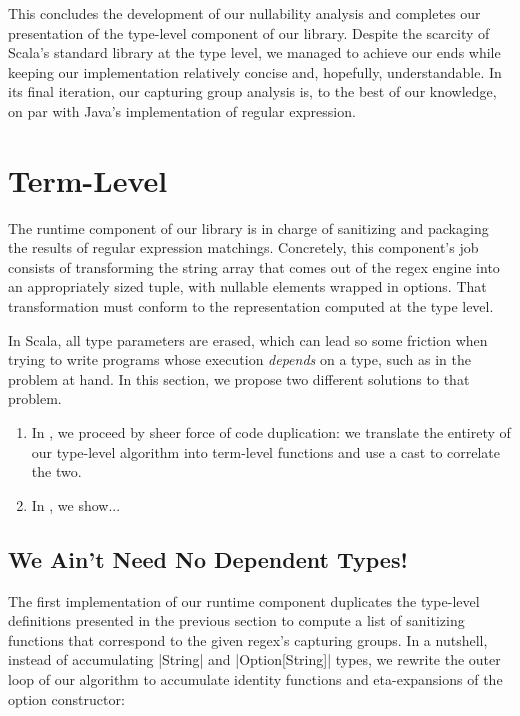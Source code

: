 This concludes the development of our nullability analysis and completes our presentation of the type-level component of our library.
Despite the scarcity of Scala's standard library at the type level, we managed to achieve our ends while keeping our implementation relatively concise and, hopefully, understandable.
In its final iteration, our capturing group analysis is, to the best of our knowledge, on par with Java's implementation of regular expression.

\section{Term-Level}
\label{sec:term-level}

The runtime component of our library is in charge of sanitizing and packaging the results of regular expression matchings.
Concretely, this component's job consists of transforming the string array that comes out of the regex engine into an appropriately sized tuple, with nullable elements wrapped in options.
That transformation must conform to the representation computed at the type level.

In Scala, all type parameters are erased, which can lead so some friction when trying to write programs whose execution \emph{depends} on a type, such as in the problem at hand. In this section, we propose two different solutions to that problem.

\begin{enumerate}
  \item In , we proceed by sheer force of code duplication: we translate the entirety of our type-level algorithm into term-level functions and use a cast to correlate the two.

  \item In , we show...
\end{enumerate}

\subsection{We Ain't Need No Dependent Types!}
\label{subsec:we-ain-t-need-no-dependent-types}

The first implementation of our runtime component duplicates the type-level definitions presented in the previous section to compute a list of sanitizing functions that correspond to the given regex's capturing groups.
In a nutshell, instead of accumulating |String| and |Option[String]| types, we rewrite the outer loop of our algorithm to accumulate identity functions and eta-expansions of the option constructor:

